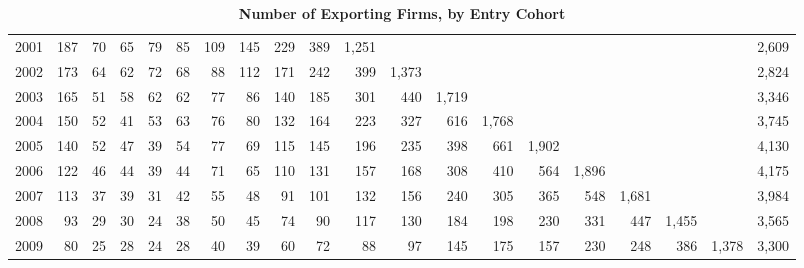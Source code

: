 \documentclass[12pt]{article}
\begin{document}
\begin{table}
{\begin{tabular}{l|rrrrrrrrrrrrrrrrrr|r}
2001     & 187   & 70    & 65    & 79   & 85   & 109  & 145  & 229   & 389   & 1,251 &       &       &       &       &       &       &       &       & 2,609 \\
2002     & 173   & 64    & 62    & 72   & 68   & 88   & 112  & 171   & 242   & 399   & 1,373 &       &       &       &       &       &       &       & 2,824 \\
2003     & 165   & 51    & 58    & 62   & 62   & 77   & 86   & 140   & 185   & 301   & 440   & 1,719 &       &       &       &       &       &       & 3,346 \\
2004     & 150   & 52    & 41    & 53   & 63   & 76   & 80   & 132   & 164   & 223   & 327   & 616   & 1,768 &       &       &       &       &       & 3,745 \\
2005     & 140   & 52    & 47    & 39   & 54   & 77   & 69   & 115   & 145   & 196   & 235   & 398   & 661   & 1,902 &       &       &       &       & 4,130 \\
2006     & 122   & 46    & 44    & 39   & 44   & 71   & 65   & 110   & 131   & 157   & 168   & 308   & 410   & 564   & 1,896 &       &       &       & 4,175 \\
2007     & 113   & 37    & 39    & 31   & 42   & 55   & 48   & 91    & 101   & 132   & 156   & 240   & 305   & 365   & 548   & 1,681 &       &       & 3,984 \\
2008     & 93    & 29    & 30    & 24   & 38   & 50   & 45   & 74    & 90    & 117   & 130   & 184   & 198   & 230   & 331   & 447   & 1,455 &       & 3,565 \\
2009     & 80    & 25    & 28    & 24   & 28   & 40   & 39   & 60    & 72    & 88    & 97    & 145   & 175   & 157   & 230   & 248   & 386   & 1,378 & 3,300 \\ \hline

    \end{tabular}
}
    \caption{\textbf{Number of Exporting Firms, by Entry Cohort}}
    \label{tab:firm_num_by_cohort}\centering
\end{table}
\end{document}
